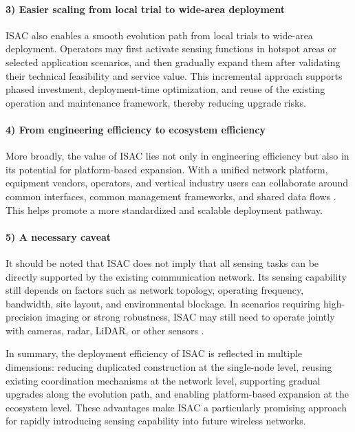 \paragraph{3) Easier scaling from local trial to wide-area deployment}
ISAC also enables a smooth evolution path from local trials to wide-area deployment. Operators may first activate sensing functions in hotspot areas or selected application scenarios, and then gradually expand them after validating their technical feasibility and service value. This incremental approach supports phased investment, deployment-time optimization, and reuse of the existing operation and maintenance framework, thereby reducing upgrade risks.

\paragraph{4) From engineering efficiency to ecosystem efficiency}
More broadly, the value of ISAC lies not only in engineering efficiency but also in its potential for platform-based expansion. With a unified network platform, equipment vendors, operators, and vertical industry users can collaborate around common interfaces, common management frameworks, and shared data flows \cite{IMT2030Framework,Letaief2019Roadmap}. This helps promote a more standardized and scalable deployment pathway.

\paragraph{5) A necessary caveat}
It should be noted that ISAC does not imply that all sensing tasks can be directly supported by the existing communication network. Its sensing capability still depends on factors such as network topology, operating frequency, bandwidth, site layout, and environmental blockage. In scenarios requiring high-precision imaging or strong robustness, ISAC may still need to operate jointly with cameras, radar, LiDAR, or other sensors \cite{Zhang2021ISAC6G, Wei2023Integrated}.

In summary, the deployment efficiency of ISAC is reflected in multiple dimensions: reducing duplicated construction at the single-node level, reusing existing coordination mechanisms at the network level, supporting gradual upgrades along the evolution path, and enabling platform-based expansion at the ecosystem level. These advantages make ISAC a particularly promising approach for rapidly introducing sensing capability into future wireless networks.

